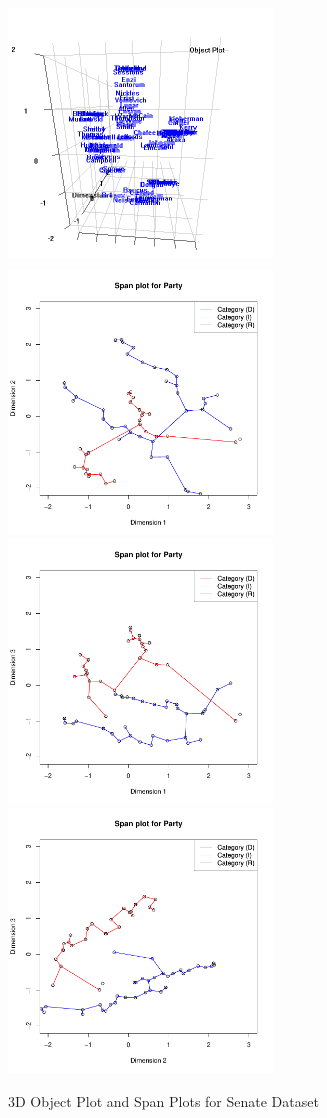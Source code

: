 \documentclass[article]{jss1}
\begin{document}
\begin{figure}[ht]
\begin{center}
\includegraphics[height=70mm, width=70mm]{senate.png}
\includegraphics[height=70mm, width=70mm]{senatespan12.pdf}
\includegraphics[height=70mm, width=70mm]{senatespan13.pdf}
\includegraphics[height=70mm, width=70mm]{senatespan23.pdf}
\caption{\label{fig:sen} 3D Object Plot and Span Plots for Senate Dataset}
\end{center}
\end{figure}
\end{document}
